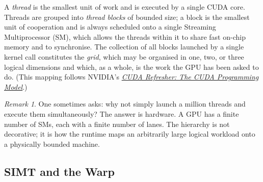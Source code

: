 \documentclass[11pt,a4paper]{article}
\theoremstyle{definition}
\theoremstyle{remark}
\newtheorem*{remark}{Remark}
\theoremstyle{plain}
\begin{document}
\begin{center}
\end{center}

A \emph{thread} is the smallest unit of work and is executed by a
single CUDA core. Threads are grouped into \emph{thread blocks} of
bounded size; a block is the smallest unit of cooperation and is
always scheduled onto a single Streaming Multiprocessor (SM), which
allows the threads within it to share fast on-chip memory and to
synchronise. The collection of all blocks launched by a single
kernel call constitutes the \emph{grid}, which may be organised in
one, two, or three logical dimensions and which, as a whole, is the
work the GPU has been asked to do. (This mapping follows NVIDIA's
\href{https://developer.nvidia.com/blog/cuda-refresher-cuda-programming-model/}{\textit{CUDA
Refresher: The CUDA Programming Model}}.)

\begin{remark}
One sometimes asks: why not simply launch a million threads and
execute them simultaneously? The answer is hardware. A GPU has a
finite number of SMs, each with a finite number of lanes. The
hierarchy is not decorative; it is how the runtime maps an
arbitrarily large logical workload onto a physically bounded
machine.
\end{remark}

\subsection{SIMT and the Warp}
\end{document}
